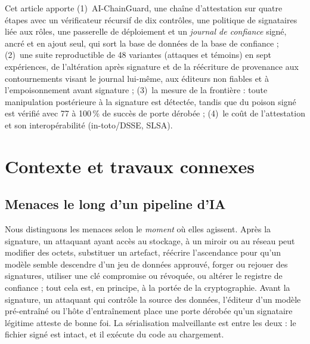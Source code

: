 \documentclass[conference]{IEEEtran}
\newcommand{\sys}{AI-ChainGuard}
\begin{document}
Cet article apporte (1)~\sys, une chaîne d'attestation sur quatre étapes avec un vérificateur récursif de dix contrôles, une politique de signataires liée aux rôles, une passerelle de déploiement et un \emph{journal de confiance} signé, ancré et en ajout seul, qui sort la base de données de la base de confiance ; (2)~une suite reproductible de 48 variantes (attaques et témoins) en sept expériences, de l'altération après signature et de la réécriture de provenance aux contournements visant le journal lui-même, aux éditeurs non fiables et à l'empoisonnement avant signature ; (3)~la mesure de la frontière : toute manipulation postérieure à la signature est détectée, tandis que du poison signé est vérifié avec 77 à 100\,\% de succès de porte dérobée ; (4)~le coût de l'attestation et son interopérabilité (in-toto/DSSE, SLSA).

\section{Contexte et travaux connexes}\label{sec:related}

\subsection{Menaces le long d'un pipeline d'IA}
Nous distinguons les menaces selon le \emph{moment} où elles agissent. Après la signature, un attaquant ayant accès au stockage, à un miroir ou au réseau peut modifier des octets, substituer un artefact, réécrire l'ascendance pour qu'un modèle semble descendre d'un jeu de données approuvé, forger ou rejouer des signatures, utiliser une clé compromise ou révoquée, ou altérer le registre de confiance ; tout cela est, en principe, à la portée de la cryptographie. Avant la signature, un attaquant qui contrôle la source des données, l'éditeur d'un modèle pré-entraîné ou l'hôte d'entraînement place une porte dérobée \cite{badnets} qu'un signataire légitime atteste de bonne foi. La sérialisation malveillante \cite{jfrog2024,rl2025} est entre les deux : le fichier signé est intact, et il exécute du code au chargement.
\end{document}
